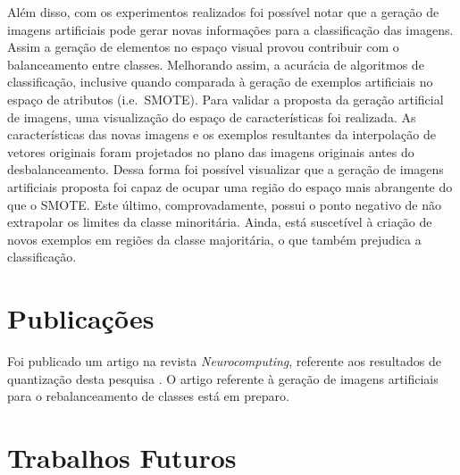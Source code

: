 Além disso, com os experimentos realizados foi possível notar que a geração de imagens artificiais pode gerar novas informações para a classificação das imagens. Assim a geração de elementos no espaço visual provou contribuir com o balanceamento entre classes. Melhorando assim, a acurácia de algoritmos de classificação, inclusive quando comparada à geração de exemplos artificiais no espaço de atributos (i.e.\ SMOTE). Para validar a proposta da geração artificial de imagens, uma visualização do espaço de características foi realizada. As características das novas imagens e os exemplos resultantes da interpolação de vetores originais foram projetados no plano das imagens originais antes do desbalanceamento. Dessa forma foi possível visualizar que a geração de imagens artificiais proposta foi capaz de ocupar uma região do espaço mais abrangente do que o SMOTE. Este último, comprovadamente, possui o ponto negativo de não extrapolar os limites da classe minoritária. Ainda, está suscetível à criação de novos exemplos em regiões da classe majoritária, o que também prejudica a classificação.

\section{Publicações}

Foi publicado um artigo na revista \textit{Neurocomputing}, referente aos resultados de quantização desta pesquisa \cite{Ponti2016}. O artigo referente à geração de imagens artificiais para o rebalanceamento de classes está em preparo.


\section{Trabalhos Futuros}


